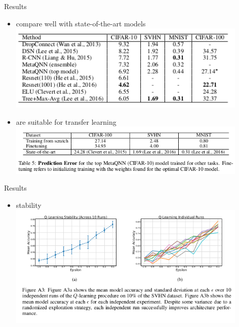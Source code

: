 \documentclass{beamer}
\begin{document}
\begin{frame}{Results}
  \begin{itemize}
  \item compare well with state-of-the-art models
  \includegraphics[width=0.9\textwidth]{state_art.png}
  \item are suitable for transfer learning
  \includegraphics[width=0.9\textwidth]{transfer.png}
  \end{itemize}
\end{frame}

\begin{frame}{Results}
  \begin{itemize}
  \item stability
  \includegraphics[width=0.9\textwidth]{stability.png}
  \end{itemize}
\end{frame}
\end{document}
